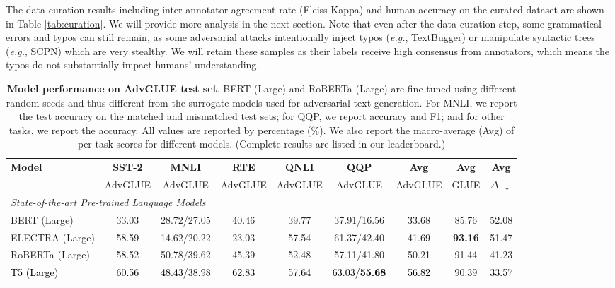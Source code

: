 \documentclass{article}
\newcommand{\method}{AdvGLUE\xspace}
\newcommand{\m}[1]{{\textcolor{black}{{#1}}}}
\begin{document}
The data curation results including inter-annotator agreement rate (Fleiss Kappa) and human accuracy on the curated dataset are shown in Table \ref{tab:curation}. 
We will provide more analysis in the next section.
Note that even after the data curation step, some grammatical errors and typos can still remain, as some adversarial attacks intentionally inject typos (\emph{e.g.}, TextBugger) or manipulate syntactic trees (\emph{e.g.}, SCPN) which are very stealthy. We will retain these samples as their labels receive high consensus from annotators, which means the typos do not substantially impact humans' understanding.

\begin{table}[t]
\small
    \centering
    \caption{\small \textbf{Model performance on \method test set}. BERT (Large) and RoBERTa (Large) are fine-tuned using different random seeds and thus different from the surrogate models used for adversarial text generation. 
    For MNLI, we report the test accuracy on the matched  and mismatched test sets; for QQP, we report accuracy and F1; and for other tasks, we report the accuracy. All values are reported by percentage (\%). We also report the macro-average (Avg) of per-task scores for different models. (Complete results are listed in our leaderboard.)}
    \label{tab:benchmark}
\setlength{\tabcolsep}{3.75pt}
    \begin{tabular}{l|ccccc|ccc}
    \toprule
    \multirow{2}{*}{\textbf{Model}} & \multirow{1}{*}{\textbf{SST-2}} &  \multirow{1}{*}{\textbf{MNLI}} &  \multirow{1}{*}{\textbf{RTE}} &  \multirow{1}{*}{\textbf{QNLI}} &   \multirow{1}{*}{\textbf{QQP}} & \textbf{Avg} & \textbf{Avg} & \textbf{Avg}   \\
         & \scriptsize{AdvGLUE} & \scriptsize{AdvGLUE} & \scriptsize{AdvGLUE} & \scriptsize{AdvGLUE} & \scriptsize{AdvGLUE} & \scriptsize{AdvGLUE} & \scriptsize{GLUE} & \scriptsize{$\Delta$} $\downarrow$ \\
    \midrule 
    \multicolumn{8}{l}{\emph{State-of-the-art Pre-trained Language Models}} \\
    \midrule
    {BERT (Large)} & 33.03 & 28.72/27.05 & 40.46 & 39.77 & 37.91/16.56 & 33.68 & 85.76  & 52.08 \\
    {ELECTRA (Large)} & 58.59 & 14.62/20.22 & 23.03 & 57.54 & 61.37/42.40  & 41.69 & \textbf{93.16} & 51.47 \\
    {RoBERTa (Large)} & 58.52 & 50.78/39.62 & 45.39 & 52.48 & 57.11/41.80  & 50.21 & 91.44 & 41.23 \\
    \m{{T5 (Large)}} & \m{60.56} & \m{48.43/38.98} & \m{62.83} & \m{57.64} & \m{63.03/\textbf{55.68}} & \m{56.82} & \m{90.39} & \m{33.57} \\

\end{tabular}
\end{table}
\end{document}

